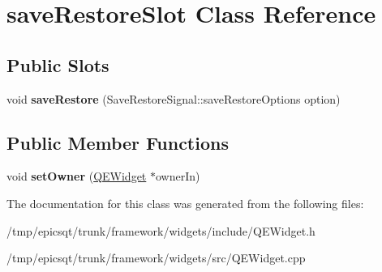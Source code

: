 \hypertarget{classsaveRestoreSlot}{
\section{saveRestoreSlot Class Reference}
\label{classsaveRestoreSlot}
}
\subsection*{Public Slots}
\begin{DoxyCompactItemize}
\item 
\hypertarget{classsaveRestoreSlot_a38f601d6560c0822a595275a3af10d74}{
void {\bfseries saveRestore} (SaveRestoreSignal::saveRestoreOptions option)}
\label{classsaveRestoreSlot_a38f601d6560c0822a595275a3af10d74}

\end{DoxyCompactItemize}
\subsection*{Public Member Functions}
\begin{DoxyCompactItemize}
\item 
\hypertarget{classsaveRestoreSlot_a9b74df73570634455d5382ff6ad551de}{
void {\bfseries setOwner} (\hyperlink{classQEWidget}{QEWidget} $\ast$ownerIn)}
\label{classsaveRestoreSlot_a9b74df73570634455d5382ff6ad551de}

\end{DoxyCompactItemize}


The documentation for this class was generated from the following files:\begin{DoxyCompactItemize}
\item 
/tmp/epicsqt/trunk/framework/widgets/include/QEWidget.h\item 
/tmp/epicsqt/trunk/framework/widgets/src/QEWidget.cpp\end{DoxyCompactItemize}

